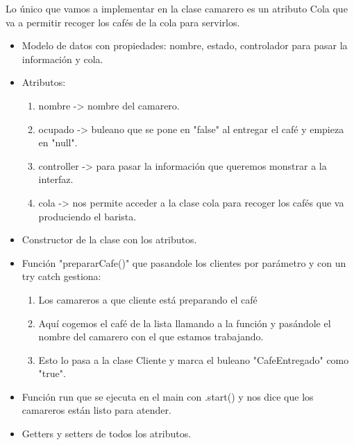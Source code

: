 \documentclass[a4paper,12pt]{article}
\begin{document}
Lo único que vamos a implementar en la clase camarero es un atributo Cola que va a permitir recoger los cafés de la cola para servirlos.
\begin{itemize}
\item Modelo de datos con propiedades: nombre, estado, controlador para pasar la información y cola.
\item Atributos:
    \begin{enumerate}
        \item nombre -> nombre del camarero.
        \item ocupado -> buleano que se pone en "false" al entregar el café y empieza en "null".
        \item controller -> para pasar la información que queremos monstrar a la interfaz.
        \item cola -> nos permite acceder a la clase cola para recoger los cafés que va produciendo el barista.
    \end{enumerate}
\item Constructor de la clase con los atributos.
\item Función "prepararCafe()" que pasandole los clientes por parámetro y con un try catch gestiona:
    \begin{enumerate}
        \item Los camareros a que cliente está preparando el café
        \item Aquí cogemos el café de la lista llamando a la función y pasándole el nombre del camarero con el que estamos trabajando.
        \item Esto lo pasa a la clase Cliente y marca el buleano "CafeEntregado" como "true".
    \end{enumerate}
\item Función run que se ejecuta en el main con .start() y nos dice que los camareros están listo para atender.
\item Getters y setters de todos los atributos. 
\end{itemize}
\end{document}
